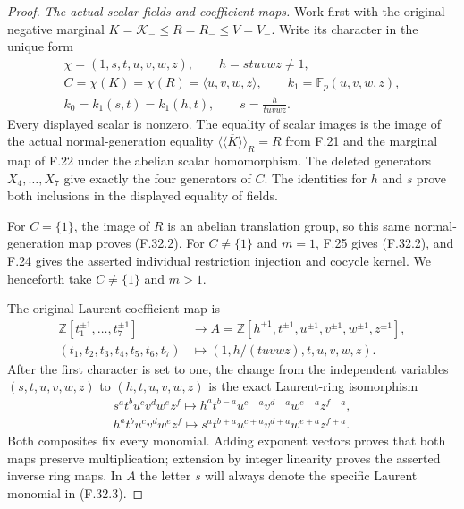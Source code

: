 \begin{proof}
\emph{The actual scalar fields and coefficient maps.}
Work first with the original negative
marginal $K=\mathcal K_-\leq R=R_-\leq V=V_-$.
Write its character in the unique form
\[
 \begin{gathered}
 \chi=(1,s,t,u,v,w,z),\qquad h=stuvwz\ne1,\\
 C=\chi(K)=\chi(R)=\langle u,v,w,z\rangle,\qquad
 k_1=\mathbb F_p(u,v,w,z),\\
 k_0=k_1(s,t)=k_1(h,t),\qquad
                       s=\frac{h}{tuv wz}.
 \end{gathered}                                                \tag{F.32.3}
\]
Every displayed scalar is nonzero.
The equality of scalar images is the
image of the actual normal-generation
equality
$\overline{\langle\!\langle K\rangle\!\rangle}_R=R$
from F.21 and the marginal map of F.22
under the abelian scalar homomorphism.
The deleted generators $X_4,\ldots,X_7$
give exactly the four generators of $C$.
The identities for $h$ and $s$ prove
both inclusions in the displayed
equality of fields.

For $C=\{1\}$, the image of $R$ is
an abelian translation group, so this
same normal-generation map proves
(F.32.2). For $C\ne\{1\}$ and $m=1$,
F.25 gives (F.32.2), and F.24 gives
the asserted individual restriction
injection and cocycle kernel.
We henceforth take $C\ne\{1\}$ and $m>1$.

The original Laurent coefficient map is
\[
 \begin{aligned}
 \mathbb Z[t_1^{\pm1},\ldots,t_7^{\pm1}]
   &\longrightarrow
       A=\mathbb Z[h^{\pm1},t^{\pm1},u^{\pm1},v^{\pm1},w^{\pm1},z^{\pm1}],\\
 (t_1,t_2,t_3,t_4,t_5,t_6,t_7)
   &\longmapsto (1,h/(tuv wz),t,u,v,w,z).
 \end{aligned}                                                \tag{F.32.4}
\]
After the first character is set to one,
the change from the independent variables
$(s,t,u,v,w,z)$ to $(h,t,u,v,w,z)$ is
the exact Laurent-ring isomorphism
\[
 \begin{gathered}
 s^at^bu^cv^dw^ez^f
    \longmapsto h^at^{b-a}u^{c-a}v^{d-a}w^{e-a}z^{f-a},\\
 h^at^bu^cv^dw^ez^f
    \longmapsto s^at^{b+a}u^{c+a}v^{d+a}w^{e+a}z^{f+a}.
 \end{gathered}                                                \tag{F.32.5}
\]
Both composites fix every monomial.
Adding exponent vectors proves that
both maps preserve multiplication;
extension by integer linearity proves
the asserted inverse ring maps.
In $A$ the letter $s$ will always denote
the specific Laurent monomial in (F.32.3).


\end{proof}
